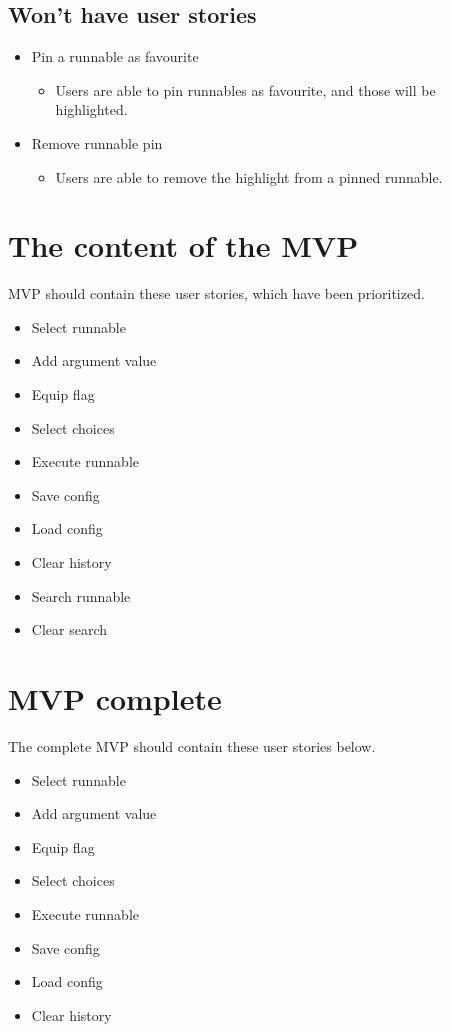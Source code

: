 \documentclass{article}
\begin{document}
\subsection{Won't have user stories }
\begin{itemize}
    \item Pin a runnable as favourite
    \begin{itemize}
        \item Users are able to pin runnables as favourite, and those will be highlighted.
    \end{itemize}
    \item Remove runnable pin
    \begin{itemize}
        \item Users are able to remove the highlight from a pinned runnable.
    \end{itemize}
\end{itemize}

\section{The content of the MVP}
MVP should contain these user stories, which have been prioritized.
\begin{itemize}
    \item Select runnable
    \item Add argument value
    \item Equip flag
    \item Select choices
    \item Execute runnable
    \item Save config
    \item Load config
    \item Clear history
    \item Search runnable
    \item Clear search
\end{itemize}

\section{MVP complete}
The complete MVP should contain these user stories below.
\begin{itemize}
    \item Select runnable
    \item Add argument value
    \item Equip flag
    \item Select choices
    \item Execute runnable
    \item Save config
    \item Load config
    \item Clear history
\end{itemize}
\end{document}
